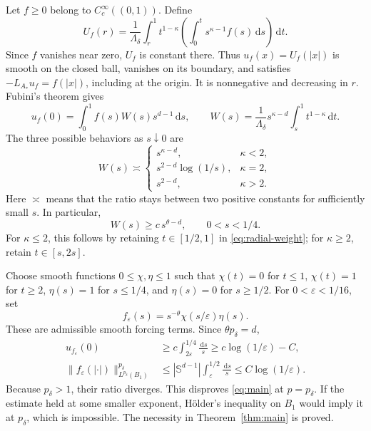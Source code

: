 \documentclass[11pt,a4paper,reqno]{amsart}
\theoremstyle{plain}
\theoremstyle{remark}
\numberwithin{equation}{section}
\newcommand{\lam}{\Lambda_\delta}
\newcommand{\pcrit}{p_\delta}
\newcommand{\dd}{\,\mathrm d}
\newcommand{\norm}[1]{\lVert#1\rVert}
\begin{document}
Let $f\ge0$ belong to $C_c^\infty((0,1))$. Define
\begin{equation}\label{eq:radial-solution}
 U_f(r)=\frac1{\lam}\int_r^1 t^{1-\kappa}
                 \left(\int_0^t s^{\kappa-1}f(s)\dd s\right)\dd t.
\end{equation}
Since $f$ vanishes near zero, $U_f$ is constant there. Thus $u_f(x)=U_f(|x|)$ is smooth on the closed ball, vanishes on its boundary, and satisfies $-L_{A_*}u_f=f(|x|)$, including at the origin. It is nonnegative and decreasing in $r$. Fubini's theorem gives
\begin{equation}\label{eq:radial-weight}
 u_f(0)=\int_0^1 f(s)W(s)s^{d-1}\dd s,
 \qquad W(s)=\frac1{\lam}s^{\kappa-d}\int_s^1t^{1-\kappa}\dd t.
\end{equation}
The three possible behaviors as $s\downarrow0$ are
\begin{equation}\label{eq:weight-asymptotics}
 W(s)\asymp
 \begin{cases}
  s^{\kappa-d},&\kappa<2,\\
  s^{2-d}\log(1/s),&\kappa=2,\\
  s^{2-d},&\kappa>2.
 \end{cases}
\end{equation}
Here $\asymp$ means that the ratio stays between two positive constants for sufficiently small $s$. In particular,
\begin{equation}\label{eq:weight-lower}
 W(s)\ge c\,s^{\theta-d},\qquad 0<s<1/4.
\end{equation}
For $\kappa\le2$, this follows by retaining $t\in[1/2,1]$ in \eqref{eq:radial-weight}; for $\kappa\ge2$, retain $t\in[s,2s]$.

Choose smooth functions $0\le\chi,\eta\le1$ such that $\chi(t)=0$ for $t\le1$, $\chi(t)=1$ for $t\ge2$, $\eta(s)=1$ for $s\le1/4$, and $\eta(s)=0$ for $s\ge1/2$. For $0<\varepsilon<1/16$, set
\[
 f_\varepsilon(s)=s^{-\theta}\chi(s/\varepsilon)\eta(s).
\]
These are admissible smooth forcing terms. Since $\theta\pcrit=d$,
\begin{align}
 u_{f_\varepsilon}(0)
 &\ge c\int_{2\varepsilon}^{1/4}\frac{\dd s}{s}
 \ge c\log(1/\varepsilon)-C,\label{eq:radial-log-lower}\\
 \norm{f_\varepsilon(|\cdot|)}_{L^{\pcrit}(B_1)}^{\pcrit}
 &\le |\mathbb S^{d-1}|\int_\varepsilon^{1/2}\frac{\dd s}{s}
 \le C\log(1/\varepsilon).\label{eq:radial-log-upper}
\end{align}
Because $\pcrit>1$, their ratio diverges. This disproves \eqref{eq:main} at $p=\pcrit$. If the estimate held at some smaller exponent, H\"older's inequality on $B_1$ would imply it at $\pcrit$, which is impossible. The necessity in Theorem~\ref{thm:main} is proved.
\end{document}
